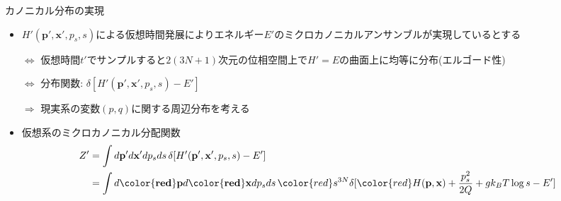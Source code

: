 
\begin{frame}[t,fragile]{カノニカル分布の実現}
  \begin{itemize}
  \item $H'(\mathbf{p}',\mathbf{x}',p_s,s)$による仮想時間発展によりエネルギー$E'$のミクロカノニカルアンサンブルが実現しているとする

    $\Leftrightarrow$ 仮想時間$t'$でサンプルすると$2(3N+1)$次元の位相空間上で$H'=E$の曲面上に均等に分布(エルゴード性)
    
    $\Leftrightarrow$ 分布関数: $\delta [ H'(\mathbf{p}',\mathbf{x}',p_s,s) - E']$
    
    $\Rightarrow$ 現実系の変数$(p,q)$に関する周辺分布を考える
  \item 仮想系のミクロカノニカル分配関数
    \begin{align*}
      Z'&=\int d\mathbf{p}' d\mathbf{x}' dp_s ds \, \delta [ H'(\mathbf{p}',\mathbf{x}',p_s,s) - E'] \\
      &=\int d\mathbf{{\color{red}p}} d\mathbf{{\color{red}x}} dp_s ds \, {\color{red}s^{3N}} \delta [ {\color{red}H(\mathbf{p},\mathbf{x})} + \frac{p_s^2}{2Q} + g k_B T \log s - E']
    \end{align*}
  \end{itemize}
\end{frame}
